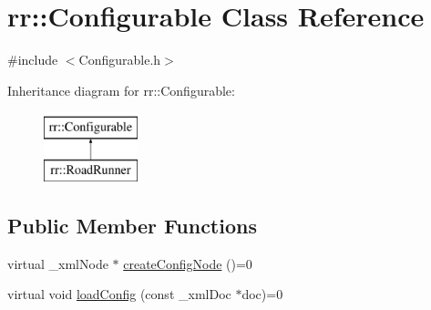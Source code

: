 \hypertarget{classrr_1_1_configurable}{\section{rr\-:\-:Configurable Class Reference}
\label{classrr_1_1_configurable}
}


{\ttfamily \#include $<$Configurable.\-h$>$}

Inheritance diagram for rr\-:\-:Configurable\-:\begin{figure}[H]
\begin{center}
\leavevmode
\includegraphics[height=2.000000cm]{classrr_1_1_configurable}
\end{center}
\end{figure}
\subsection*{Public Member Functions}
\begin{DoxyCompactItemize}
\item 
virtual \-\_\-xml\-Node $\ast$ \hyperlink{classrr_1_1_configurable_af1eeec76874dccc105e70f5fd2255df3}{create\-Config\-Node} ()=0
\item 
virtual void \hyperlink{classrr_1_1_configurable_add9f6002952f1d4a4672ead64b5821ab}{load\-Config} (const \-\_\-xml\-Doc $\ast$doc)=0
\end{DoxyCompactItemize}
